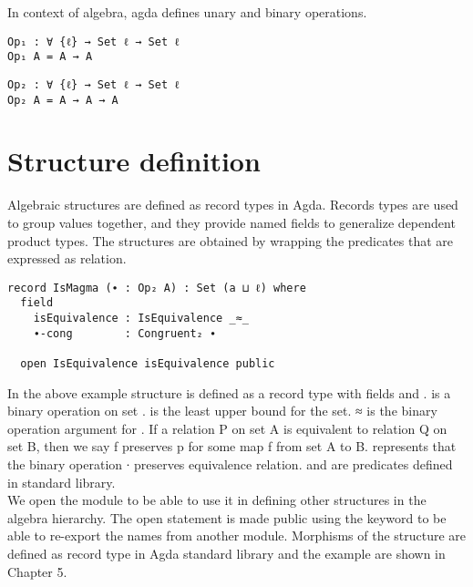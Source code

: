 In context of algebra, agda defines unary  and binary
 operations.
\begin{verbatim}
Op₁ : ∀ {ℓ} → Set ℓ → Set ℓ
Op₁ A = A → A
\end{verbatim}
\begin{verbatim}
Op₂ : ∀ {ℓ} → Set ℓ → Set ℓ
Op₂ A = A → A → A
\end{verbatim}

\section{Structure definition}
Algebraic structures are defined as record types in Agda. Records types are used
to group values together, and they provide named fields to generalize dependent
product types. The structures are obtained by wrapping the predicates that are
expressed as  relation. ~\citep{hu2021formalizing}
\begin{verbatim}
record IsMagma (∙ : Op₂ A) : Set (a ⊔ ℓ) where
  field
    isEquivalence : IsEquivalence _≈_
    ∙-cong        : Congruent₂ ∙

  open IsEquivalence isEquivalence public
\end{verbatim}
In the above example structure  is defined as a record type with
fields  and .  is a binary
operation on set .  is the least upper bound for the
set. \textunderscore  ≈ \textunderscore is the binary operation argument for
. If a relation P on set A is equivalent to relation Q on
set B, then we say f preserves p for some map f from set A to B.
 represents that the binary operation ∙ preserves
equivalence relation.  and  are
predicates defined in standard library.\\
We open the module  to be able to use it in defining other
structures in the algebra hierarchy. The open statement is made public using the
keyword  to be able to re-export the names from another module.
Morphisms of the structure are defined as record type in Agda standard library
and the example are shown in Chapter 5.

